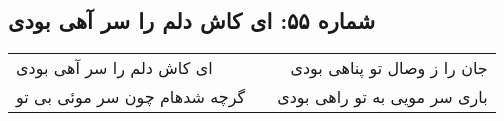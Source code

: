 \begin{center}
\section*{شماره ۵۵: ای کاش دلم را سر آهی بودی}
\label{sec:055}
\begin{longtable}{l p{0.5cm} r}
ای کاش دلم را سر آهی بودی
&&
جان را ز وصال تو پناهی بودی
\\
گرچه شدهام چون سر موئی بی تو
&&
باری سر مویی به تو راهی بودی
\\
\end{longtable}
\end{center}
